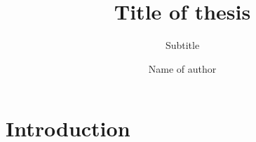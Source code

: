 \documentclass[
    11pt,           %
	]{uit-thesis}
\begin{document}

\title{Title of thesis}
\subtitle{Subtitle}                                                     %
\author{Name of author}

\maketitle

\frontmatter

%


\begin{abstract}

\end{abstract}


\tableofcontents

\mainmatter

\chapter{Introduction}
\label{chapter:introduction}










\backmatter
\end{document}
